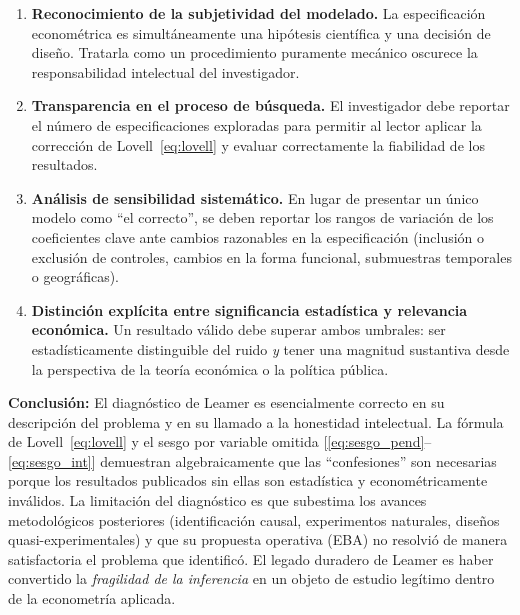 \documentclass[12pt, letterpaper]{article}
\begin{document}
\begin{enumerate}[leftmargin=1.8cm, label=\textbf{P\arabic*.}]

  \item \textbf{Reconocimiento de la subjetividad del modelado.} La
    especificación econométrica es simultáneamente una hipótesis científica
    y una decisión de diseño. Tratarla como un procedimiento puramente
    mecánico oscurece la responsabilidad intelectual del investigador.

  \item \textbf{Transparencia en el proceso de búsqueda.} El investigador
    debe reportar el número de especificaciones exploradas para permitir
    al lector aplicar la corrección de Lovell~\eqref{eq:lovell} y evaluar
    correctamente la fiabilidad de los resultados.

  \item \textbf{Análisis de sensibilidad sistemático.} En lugar de
    presentar un único modelo como ``el correcto'', se deben reportar
    los rangos de variación de los coeficientes clave ante cambios razonables
    en la especificación (inclusión o exclusión de controles, cambios
    en la forma funcional, submuestras temporales o geográficas).

  \item \textbf{Distinción explícita entre significancia estadística y
    relevancia económica.} Un resultado válido debe superar ambos umbrales:
    ser estadísticamente distinguible del ruido \emph{y} tener una
    magnitud sustantiva desde la perspectiva de la teoría económica o
    la política pública.

\end{enumerate}

\begin{clave}
  \textbf{Conclusión:} El diagnóstico de Leamer es esencialmente correcto
  en su descripción del problema y en su llamado a la honestidad intelectual.
  La fórmula de Lovell~\eqref{eq:lovell} y el sesgo por variable omitida
  [\eqref{eq:sesgo_pend}--\eqref{eq:sesgo_int}] demuestran algebraicamente
  que las ``confesiones'' son necesarias porque los resultados publicados
  sin ellas son estadística y econométricamente inválidos.
  La limitación del diagnóstico es que subestima los avances metodológicos
  posteriores (identificación causal, experimentos naturales, diseños
  quasi-experimentales) y que su propuesta operativa (EBA) no resolvió
  de manera satisfactoria el problema que identificó. El legado duradero
  de Leamer es haber convertido la \emph{fragilidad de la inferencia} en
  un objeto de estudio legítimo dentro de la econometría aplicada.
\end{clave}
\end{document}
